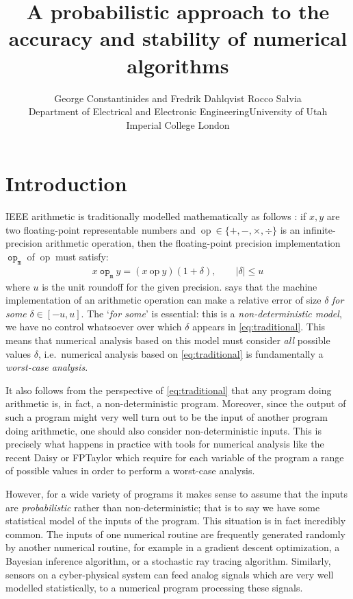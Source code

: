 \documentclass[10pt,conference]{IEEEtran}
\title{A probabilistic approach to the accuracy and stability of numerical algorithms}
\author{George Constantinides and Fredrik Dahlqvist \hspace{10em}Rocco Salvia \\ Department of Electrical and Electronic Engineering\hspace{7em}University of Utah\\ Imperial College London\hspace{13em} }
\newcommand{\ie}{i.e.\ }
\newcommand{\mop}{~\mathtt{op_m}~}
\newcommand{\iop}{~\mathrm{op}~}
\newcommand{\absv}[1]{\vert #1\vert}
\begin{document}
\maketitle

\begin{abstract}

\end{abstract}

\section{Introduction}

IEEE arithmetic \cite{ieee754} is traditionally modelled mathematically as follows \cite{higham2002accuracy}: if $x,y$ are two floating-point representable numbers and $\iop\in\{+,-,\times,\div\}$ is an infinite-precision arithmetic operation, then the floating-point precision implementation $\mop$ of $\iop$ must satisfy:
\begin{align}
x\mop y=(x\iop y)(1+\delta), \qquad\absv{\delta}\leq u\label{eq:traditional}
\end{align}
where $u$ is the unit roundoff for the given precision.  says that the machine implementation of an arithmetic operation can make a relative error of size $\delta$ \emph{for some} $\delta\in\left[-u,u\right]$. The `\emph{for some}' is essential: this is a \emph{non-deterministic model}, we have no control whatsoever over which $\delta$ appears in \cref{eq:traditional}. This means that numerical analysis based on this model must consider \emph{all} possible values $\delta$, \ie numerical analysis based on \cref{eq:traditional} is fundamentally a \emph{worst-case analysis}. 

It also follows from the perspective of \cref{eq:traditional} that any program doing arithmetic is, in fact, a non-deterministic program. Moreover, since the output of such a program might very well turn out to be the input of another program doing arithmetic, one should also consider non-deterministic inputs. This is precisely what happens in practice with tools for numerical analysis like the recent Daisy \cite{darulova2018daisy} or FPTaylor \cite{solovyev2018rigorous} which require for each variable of the program a range of possible values in order to perform a worst-case analysis.

However, for a wide variety of programs  it makes sense to assume that the inputs are \emph{probabilistic} rather than non-deterministic; that is to say we have some statistical model of the inputs of the program. This situation is in fact incredibly common. The inputs of one numerical routine are frequently generated randomly by another numerical routine, for example in a gradient descent optimization, a Bayesian inference algorithm, or a stochastic ray tracing algorithm. Similarly, sensors on a cyber-physical system can feed analog signals which are very well modelled statistically, to a numerical program processing these signals. 
\end{document}
